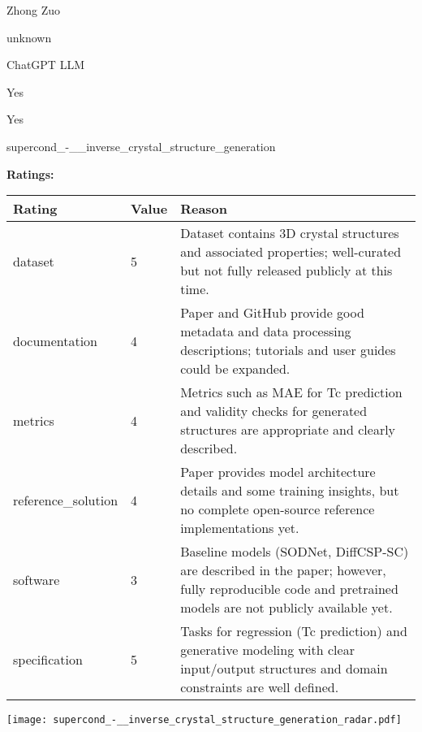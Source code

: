 {{\begin{description}[labelwidth=4cm, labelsep=1em, leftmargin=4cm, itemsep=0.1em, parsep=0em]
  \item[contact.name:] Zhong Zuo
  \item[contact.email:] unknown
  \item[results.links.name:] ChatGPT LLM
  \item[fair.reproducible:] Yes
  \item[fair.benchmark\_ready:] Yes
  \item[id:] supercond\_-\_\_inverse\_crystal\_structure\_generation
  \item[Citations:] \cite{neurips2024_c4e3b55e}
\end{description}

{\bf Ratings:} ~ \\

\begin{tabular}{p{} p{} p{}}
\hline
Rating & Value & Reason \\
\hline
dataset & 5 & Dataset contains 3D crystal structures and associated properties; well-curated but
not fully released publicly at this time.
 \\
documentation & 4 & Paper and GitHub provide good metadata and data processing descriptions; tutorials
and user guides could be expanded.
 \\
metrics & 4 & Metrics such as MAE for Tc prediction and validity checks for generated structures
are appropriate and clearly described.
 \\
reference\_solution & 4 & Paper provides model architecture details and some training insights, but no
complete open-source reference implementations yet.
 \\
software & 3 & Baseline models (SODNet, DiffCSP-SC) are described in the paper; however,
fully reproducible code and pretrained models are not publicly available yet.
 \\
specification & 5 & Tasks for regression (Tc prediction) and generative modeling with clear input/output
structures and domain constraints are well defined.
 \\
\hline
\end{tabular}

\texttt{[image: supercond\_-\_\_inverse\_crystal\_structure\_generation\_radar.pdf]}
}}
\clearpage